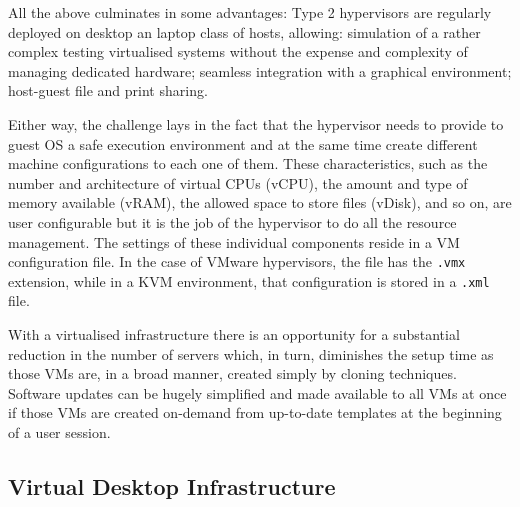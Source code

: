 \begin{description}
	All the above culminates in some advantages: Type 2 hypervisors are regularly deployed on desktop an laptop class of hosts, allowing: simulation of a rather complex testing virtualised systems without the expense and complexity of managing dedicated hardware; seamless integration with a graphical environment; host-guest file and print sharing.
\end{description}

Either way, the challenge lays in the fact that the hypervisor needs to provide to guest OS a safe execution environment and at the same time create different machine configurations to each one of them. These characteristics, such as the number and architecture of virtual CPUs (vCPU), the amount and type of memory available (vRAM), the allowed space to store files (vDisk), and so on, are user configurable but it is the job of the hypervisor to do all the resource management. The settings of these individual components reside in a VM configuration file. In the case of VMware hypervisors, the file has the \texttt{.vmx} extension,\cite{VMWare_VMFiles,Portnoy2012} while in a KVM environment, that configuration is stored in a \texttt{.xml} file.~\cite{chirammal2016}

With a virtualised infrastructure there is an opportunity for a substantial reduction in the number of servers which, in turn, diminishes the setup time as those VMs are, in a broad manner, created simply by cloning techniques. Software updates can be hugely simplified and made available to all VMs at once if those VMs are created on-demand from up-to-date templates at the beginning of a user session.



\subsection{Virtual Desktop Infrastructure} %
\label{sub:res_vdi}

